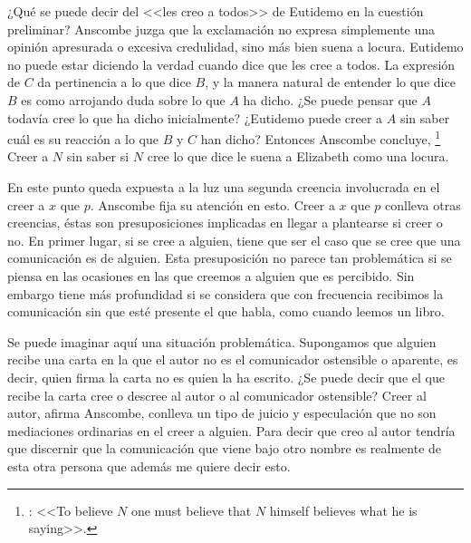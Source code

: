 ¿Qué se puede decir del <<les creo a todos>> de Eutidemo en la cuestión preliminar? Anscombe juzga que la exclamación no expresa simplemente una opinión apresurada o excesiva credulidad, sino más bien suena a locura\autocite[5]{anscombe2008faith:tobelieve}. Eutidemo no puede estar diciendo la verdad cuando dice que les cree a todos. La expresión de $C$ da pertinencia a lo que dice $B$, y la manera natural de entender lo que dice $B$ es como arrojando duda sobre lo que $A$ ha dicho. ¿Se puede pensar que $A$ todavía cree lo que ha dicho inicialmente? ¿Eutidemo puede creer a $A$ sin saber cuál es su reacción a lo que $B$ y $C$ han dicho? Entonces Anscombe concluye, \footnote{\cite[5]{anscombe2008faith:tobelieve}: <<To believe $N$ one must believe that $N$ himself believes what he is saying>>.} Creer a $N$ sin saber si $N$ cree lo que dice le suena a Elizabeth como una locura.

En este punto queda expuesta a la luz una segunda creencia involucrada en el creer a $x$ que $p$. Anscombe fija su atención en esto. Creer a $x$ que $p$ conlleva otras creencias, éstas son presuposiciones implicadas en llegar a plantearse si creer o no. En primer lugar, si se cree a alguien, tiene que ser el caso que se cree que una comunicación es de alguien\autocite[Cf.~][6]{anscombe2008faith:tobelieve}. Esta presuposición no parece tan problemática si se piensa en las ocasiones en las que creemos a alguien que es percibido. Sin embargo tiene más profundidad si se considera que con frecuencia recibimos la comunicación sin que esté presente el que habla, como cuando leemos un libro\autocite[Cf.~][5]{anscombe2008faith:tobelieve}.

Se puede imaginar aquí una situación problemática. Supongamos que alguien recibe una carta en la que el autor no es el comunicador ostensible o aparente, es decir, quien firma la carta no es quien la ha escrito. ¿Se puede decir que el que recibe la carta cree o descree al autor o al comunicador ostensible? Creer al autor, afirma Anscombe, conlleva un tipo de juicio y especulación que no son mediaciones ordinarias en el creer a alguien\autocite[Cf.~][7]{anscombe2008faith:tobelieve}. Para decir que creo al autor tendría que discernir que la comunicación que viene bajo otro nombre es realmente de esta otra persona que además me quiere decir esto.

